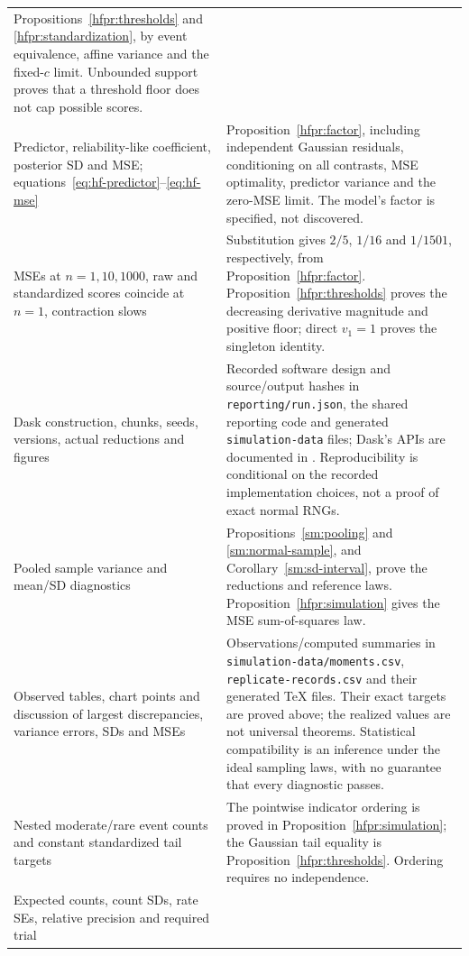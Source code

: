 \begin{longtable}{>{\raggedright\arraybackslash}p{.35\linewidth}>{\raggedright\arraybackslash}p{.59\linewidth}}
Propositions~\ref{hfpr:thresholds} and \ref{hfpr:standardization}, by
event equivalence, affine variance and the fixed-\(c\) limit. Unbounded
support proves that a threshold floor does not cap possible scores.\\
Predictor, reliability-like coefficient, posterior SD and MSE;
equations~\ref{eq:hf-predictor}--\ref{eq:hf-mse} &
Proposition~\ref{hfpr:factor}, including independent Gaussian residuals,
conditioning on all contrasts, MSE optimality, predictor variance and
the zero-MSE limit. The model's factor is specified, not discovered.\\
MSEs at \(n=1,10,1000\), raw and standardized scores coincide at
\(n=1\), contraction slows &
Substitution gives \(2/5\), \(1/16\) and \(1/1501\), respectively,
from Proposition~\ref{hfpr:factor}. Proposition~\ref{hfpr:thresholds}
proves the decreasing derivative magnitude and positive floor; direct
\(v_1=1\) proves the singleton identity.\\
Dask construction, chunks, seeds, versions, actual reductions and figures &
Recorded software design and source/output hashes in
\texttt{reporting/run.json}, the shared reporting code and generated
\texttt{simulation-data} files; Dask's APIs are documented in
\citet{daskdocs,daskArray,daskDelayed}. Reproducibility is conditional on
the recorded implementation choices, not a proof of exact normal RNGs.\\
Pooled sample variance and mean/SD diagnostics &
Propositions~\ref{sm:pooling} and \ref{sm:normal-sample}, and
Corollary~\ref{sm:sd-interval}, prove the reductions and reference laws.
Proposition~\ref{hfpr:simulation} gives the MSE sum-of-squares law.\\
Observed tables, chart points and discussion of largest discrepancies,
variance errors, SDs and MSEs &
Observations/computed summaries in \texttt{simulation-data/moments.csv},
\texttt{replicate-records.csv} and their generated TeX files. Their exact
targets are proved above; the realized values are not universal
theorems. Statistical compatibility is an inference under the ideal
sampling laws, with no guarantee that every diagnostic passes.\\
Nested moderate/rare event counts and constant standardized tail targets &
The pointwise indicator ordering is proved in
Proposition~\ref{hfpr:simulation}; the Gaussian tail equality is
Proposition~\ref{hfpr:thresholds}. Ordering requires no independence.\\
Expected counts, count SDs, rate SEs, relative precision and required trial

\end{longtable}
